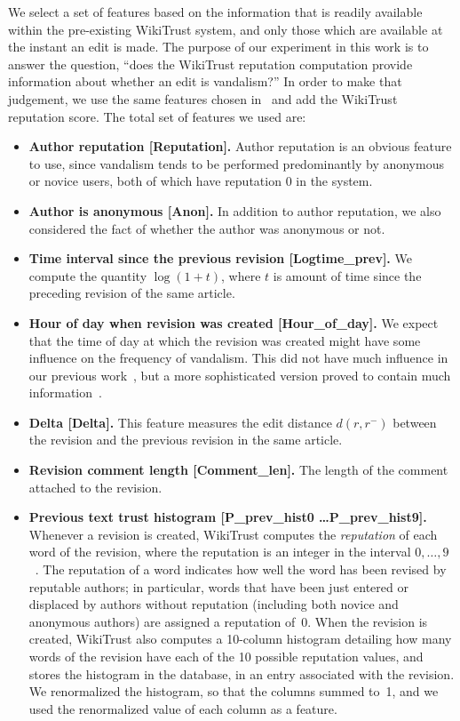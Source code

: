 We select a set of features based on the information that is readily
available within the pre-existing WikiTrust system, and only those which
are available at the instant an edit is made.
The purpose of our experiment in this work is to answer the question,
``does the WikiTrust reputation computation provide information about
whether an edit is vandalism?''
In order to make that judgement, we use the same features chosen
in~\cite{Adler2010b} and add the WikiTrust reputation score.
The total set of features we used are:
%
\begin{itemize}

\item \textbf{Author reputation [Reputation].}  Author reputation is an
obvious feature to use, since vandalism tends to be performed
predominantly by anonymous or novice users, both of which have
reputation 0 in the system.

\item \textbf{Author is anonymous [Anon].}  In addition to author
reputation, we also considered the fact of whether the author was
anonymous or not.

\item \textbf{Time interval since the previous revision [Logtime\_prev].}
We compute the quantity $\log(1 + t)$, where $t$ is amount of time since
the preceding revision of the same article.

\item \textbf{Hour of day when revision was created [Hour\_of\_day].}
We expect that the time of day at which the revision was created
might have some influence on the frequency of vandalism.
This did not have much influence in our previous work~\cite{Adler2010b},
but a more sophisticated version proved to contain much
information~\cite{West2010}.

\item \textbf{Delta [Delta].}
This feature measures the edit distance $d(r, r^{-})$ between the
revision and the previous revision in the same article.

\item \textbf{Revision comment length [Comment\_len].}
The length of the comment attached to the revision.

\item \textbf{Previous text trust histogram [P\_prev\_hist0 \ldots P\_prev\_hist9].}
Whenever a revision is created, WikiTrust computes the {\em
reputation\/} of each word of the revision, where the reputation is an
integer in the interval $0, \ldots, 9$~\cite{Adler2008b}.  The
reputation of a word indicates how well the word has been revised by
reputable authors; in particular, words that have been just entered or
displaced by authors without reputation (including both novice and
anonymous authors) are assigned a reputation of~0.  When the revision is
created, WikiTrust also computes a 10-column histogram detailing how
many words of the revision have each of the 10 possible reputation
values, and stores the histogram in the database, in an entry associated
with the revision.  We renormalized the histogram, so that the columns
summed to~1, and we used the renormalized value of each column as a
feature.


\end{itemize}
